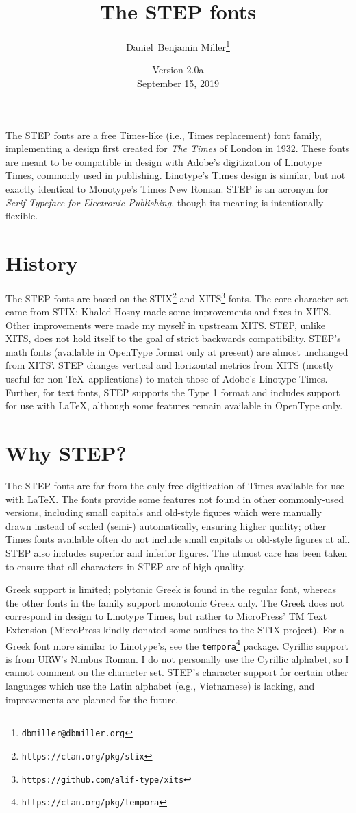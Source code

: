 \documentclass[12pt]{article}
\title{The STEP fonts}
\date{Version 2.0a\\September 15, 2019}
\author{Daniel~Benjamin Miller\thanks{\texttt{dbmiller@dbmiller.org}}}
\begin{document}
\maketitle
The STEP fonts are a free Times-like (i.e., Times replacement) font family, implementing a design first created for \textit{The Times} of London in 1932. These fonts are meant to be compatible in design with Adobe's digitization of Linotype Times, commonly used in publishing. Linotype's Times design is similar, but not exactly identical to Monotype's Times New Roman. STEP is an acronym for \textit{Serif Typeface for Electronic Publishing}, though its meaning is intentionally flexible.
\section{History}
The STEP fonts are based on the STIX\footnote{\texttt{https://ctan.org/pkg/stix}} and XITS\footnote{\texttt{https://github.com/alif-type/xits}} fonts. The core character set came from STIX; Khaled Hosny made some improvements and fixes in XITS. Other improvements were made my myself in upstream XITS. STEP, unlike XITS, does not hold itself to the goal of strict backwards compatibility. STEP's math fonts (available in OpenType format only at present) are almost unchanged from XITS'. STEP changes vertical and horizontal metrics from XITS (mostly useful for non-\TeX\ applications) to match those of Adobe's Linotype Times. Further, for text fonts, STEP supports the Type 1 format and includes support for use with \LaTeX, although some features remain available in OpenType only.
\section{Why STEP?}
The STEP fonts are far from the only free digitization of Times available for use with \LaTeX. The fonts provide some features not found in other commonly-used versions, including small capitals and old-style figures which were manually drawn instead of scaled (semi-) automatically, ensuring higher quality; other Times fonts available often do not include small capitals or old-style figures at all. STEP also includes superior and inferior figures. The utmost care has been taken to ensure that all characters in STEP are of high quality.

Greek support is limited; polytonic Greek is found in the regular font, whereas the other fonts in the family support monotonic Greek only. The Greek does not correspond in design to Linotype Times, but rather to MicroPress' TM Text Extension (MicroPress kindly donated some outlines to the STIX project). For a Greek font more similar to Linotype's, see the \texttt{tempora}\footnote{\texttt{https://ctan.org/pkg/tempora}} package. Cyrillic support is from URW's Nimbus Roman. I do not personally use the Cyrillic alphabet, so I cannot comment on the character set. STEP's character support for certain other languages which use the Latin alphabet (e.g., Vietnamese) is lacking, and improvements are planned for the future.
\end{document}
